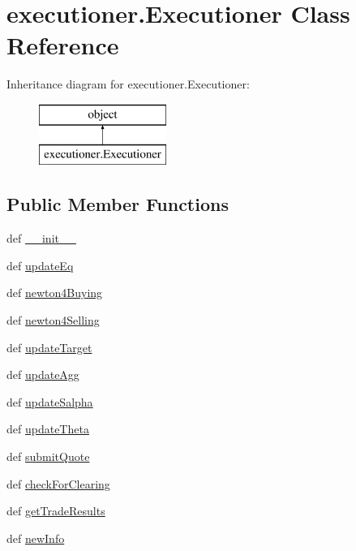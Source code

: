 \hypertarget{classexecutioner_1_1_executioner}{\section{executioner.\-Executioner Class Reference}
\label{classexecutioner_1_1_executioner}
}
Inheritance diagram for executioner.\-Executioner\-:\begin{figure}[H]
\begin{center}
\leavevmode
\includegraphics[height=2.000000cm]{classexecutioner_1_1_executioner}
\end{center}
\end{figure}
\subsection*{Public Member Functions}
\begin{DoxyCompactItemize}
\item 
def \hyperlink{classexecutioner_1_1_executioner_ac979a6b8f6262ff76f6dfb2aff3a02a9}{\-\_\-\-\_\-init\-\_\-\-\_\-}
\item 
def \hyperlink{classexecutioner_1_1_executioner_acc676e8ea7c0d98c05df94050d2f7b99}{update\-Eq}
\item 
def \hyperlink{classexecutioner_1_1_executioner_a69ab1181a0ea03a86164b0f3826536dd}{newton4\-Buying}
\item 
def \hyperlink{classexecutioner_1_1_executioner_a76a33ad9c488c16df675fdc3a979f1f0}{newton4\-Selling}
\item 
def \hyperlink{classexecutioner_1_1_executioner_adc9df6e8fed76011d387943140660daf}{update\-Target}
\item 
def \hyperlink{classexecutioner_1_1_executioner_a49799120961297e5e25eb639ab7787d2}{update\-Agg}
\item 
def \hyperlink{classexecutioner_1_1_executioner_a0ad3ecea99f174c5b511c56b6802cd74}{update\-Salpha}
\item 
def \hyperlink{classexecutioner_1_1_executioner_af57ddc03402cbc918e840142e98edb1b}{update\-Theta}
\item 
def \hyperlink{classexecutioner_1_1_executioner_a1eca19407282e2b5c3382f93ad6866a6}{submit\-Quote}
\item 
def \hyperlink{classexecutioner_1_1_executioner_af30d5e145a447670eafa57a0b239c8b6}{check\-For\-Clearing}
\item 
def \hyperlink{classexecutioner_1_1_executioner_a39b4d8b65e4e3e3bf65bdf4a2b77bade}{get\-Trade\-Results}
\item 
def \hyperlink{classexecutioner_1_1_executioner_a17c894e5f913ab3665f2f6b40318a444}{new\-Info}
\end{DoxyCompactItemize}
